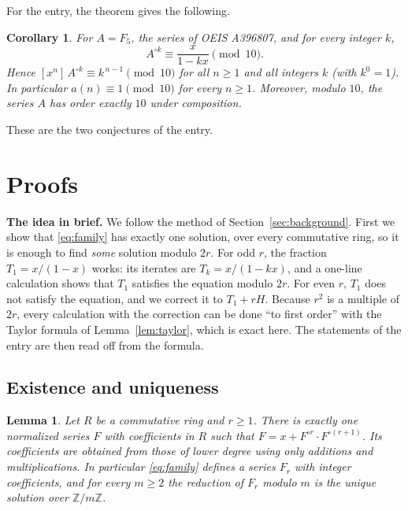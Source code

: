 \documentclass[11pt,a4paper]{article}
\newtheorem{lemma}[theorem]{Lemma}
\newtheorem{corollary}[theorem]{Corollary}
\theoremstyle{definition}
\theoremstyle{remark}
\newcommand{\Z}{\mathbb{Z}}
\newcommand{\coeff}[2]{[x^{#1}]\,#2}
\newcommand{\para}[1]{\par\medskip\noindent\textbf{#1}\enspace}
\begin{document}
For the entry, the theorem gives the following.

\begin{corollary}\label{cor:app}
For $A=F_5$, the series of OEIS A396807, and for every integer $k$,
\[
A^{\circ k}\equiv\frac{x}{1-kx}\pmod{10} .
\]
Hence $\coeff{n}{A^{\circ k}}\equiv k^{\,n-1}\pmod{10}$ for all $n\ge1$ and all integers $k$ (with $k^0=1$). In
particular $a(n)\equiv1\pmod{10}$ for every $n\ge1$. Moreover, modulo $10$, the series $A$ has order exactly $10$
under composition.
\end{corollary}
These are the two conjectures of the entry.

\section{Proofs}\label{sec:proofs}

\para{The idea in brief.} We follow the method of Section~\ref{sec:background}. First we show that
\eqref{eq:family} has exactly one solution, over every commutative ring, so it is enough to find \emph{some} solution
modulo $2r$. For odd $r$, the fraction $T_1=x/(1-x)$ works: its iterates are $T_k=x/(1-kx)$, and a one-line
calculation shows that $T_1$ satisfies the equation modulo $2r$. For even $r$, $T_1$ does not satisfy the equation, and we
correct it to $T_1+rH$. Because $r^2$ is a multiple of $2r$, every calculation with the correction can be done
``to first order'' with the Taylor formula of Lemma~\ref{lem:taylor}, which is exact here. The statements of the entry
are then read off from the formula.

\subsection{Existence and uniqueness}

\begin{lemma}\label{lem:unique}
Let $R$ be a commutative ring and $r\ge1$. There is exactly one normalized series $F$ with coefficients in $R$ such
that $F=x+F^{\circ r}\cdot F^{\circ(r+1)}$. Its coefficients are obtained from those of lower degree using only
additions and multiplications. In particular \eqref{eq:family} defines a series $F_r$ with integer coefficients, and
for every $m\ge2$ the reduction of $F_r$ modulo $m$ is the unique solution over $\Z/m\Z$.
\end{lemma}
\end{document}
